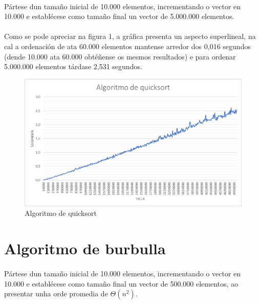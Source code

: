 \documentclass[12pt]{article}
\begin{document}
	\paragraph{}
	Pártese dun tamaño inicial de 10.000 elementos, incrementando o vector en 10.000 e establécese como tamaño final un vector de 5.000.000 elementos.
	\paragraph{}
	Como se pode apreciar na figura 1, a gráfica presenta un aspecto superlineal, na cal a ordenación de ata 60.000 elementos mantense arredor dos 0,016 segundos (dende 10.000 ata 60.000 obtéñense os mesmos resultados) e para ordenar 5.000.000 elementos tárdase 2,531 segundos.\\
	
	\begin{figure}[h]
		\centering
		\includegraphics[scale=0.45]{../graficas/quicksort_sobremesa.png}
		\caption{Algoritmo de quicksort}
	\end{figure}

\newpage
\section{Algoritmo de burbulla}
	\paragraph{}
	Pártese dun tamaño inicial de 10.000 elementos, incrementando o vector en 10.000 e establécese como tamaño final un vector de 500.000 elementos, ao presentar unha orde promedia de $\Theta(n^{2})$.
\end{document}
